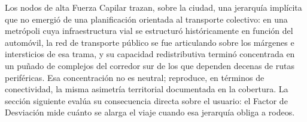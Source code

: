 Los nodos de alta Fuerza Capilar trazan, sobre la ciudad, una jerarquía
implícita que no emergió de una planificación orientada al transporte colectivo:
en una metrópoli cuya infraestructura vial se estructuró históricamente en
función del automóvil, la red de transporte público se fue articulando
sobre los márgenes e intersticios de esa trama, y su capacidad redistributiva
terminó concentrada en un puñado de complejos del corredor sur de los que
dependen decenas de rutas periféricas. Esa concentración no es neutral;
reproduce, en términos de conectividad, la misma asimetría territorial
documentada en la cobertura. La sección siguiente evalúa su consecuencia directa
sobre el usuario: el Factor de Desviación mide cuánto se alarga el viaje cuando
esa jerarquía obliga a rodeos.
